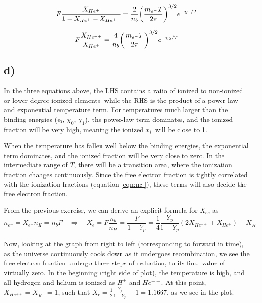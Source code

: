 \documentclass[10pt, a4paper]{article}
\renewcommand{\exp}{e^}
\renewcommand{\exp}{e^}
\begin{document}
\begin{equation}
    F\frac{X_{He^{+}}}{1 - X_{He^+} - X_{He^{++}}} = \frac{2}{n_b}\qty(\frac{m_{e^-}T}{2\pi})^{3/2} \exp{-\chi_1/T}
\end{equation}

\begin{equation}
    F\frac{X_{He^{++}}}{X_{He^{+}}} = \frac{4}{n_b}\qty(\frac{m_{e^-}T}{2\pi})^{3/2} \exp{-\chi_2/T}
\end{equation}



\subsection*{d)}
In the three equations above, the LHS contains a ratio of ionized to non-ionized or lower-degree ionized elements, while the RHS is the product of a power-law and exponential temperature term. For temperatures much larger than the binding energies ($\epsilon_0$, $\chi_0$, $\chi_1$), the power-law term dominates, and the ionized fraction will be very high, meaning the ionized $x_i$ will be close to 1.

When the temperature has fallen well below the binding energies, the exponential term dominates, and the ionized fraction will be very close to zero. In the intermediate range of $T$, there will be a transition area, where the ionization fraction changes continuously. Since the free electron fraction is tightly correlated with the ionization fractions (equation \ref{eqn:ne-}), these terms will also decide the free electron fraction.


From the previous exercise, we can derive an explicit formula for $X_e$, as
\begin{equation}
    n_{e^-} = X_{e^-}n_H = n_b F \quad \Rightarrow \quad X_e = F \frac{n_b}{n_H} = \frac{F}{1-Y_p} = \frac{1}{4}\frac{Y_p}{1-Y_p}(2X_{He^{++}} + X_{He^+}) + X_{H^+}
\end{equation}


Now, looking at the graph from right to left (corresponding to forward in time), as the universe continuously cools down as it undergoes recombination, we see the free electron fraction undergo three steps of reduction, to its final value of virtually zero. In the beginning (right side of plot), the temperature is high, and all hydrogen and helium is ionized as $H^{+}$ and $He^{++}$. At this point, $X_{He^{++}} = X_{H^+} = 1$, such that $X_e = \frac{1}{2}\frac{Y_p}{1-Y_p} + 1 = 1.1667$, as we see in the plot.
\end{document}
